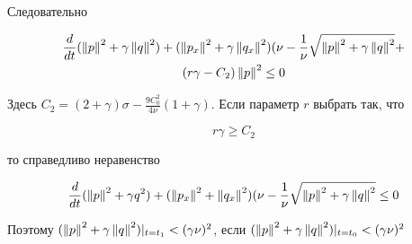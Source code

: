 Следовательно

\begin{gather*}
    \frac{d}{dt}(\left\lVert p\right\rVert^2 + \gamma \left\lVert q\right\rVert^2) + (\left\lVert p_x\right\rVert^2 + \gamma
    \left\lVert q_x\right\rVert^2)(\nu - \frac{1}{\nu}\sqrt{\left\lVert p\right\rVert^2 + \gamma \left\lVert q\right\rVert^2} + \\
    (r \gamma - C_2)\left\lVert p\right\rVert^2 \le 0
\end{gather*}

Здесь $C_2 = (2 + \gamma)\sigma - \frac{9C_0^2}{4\nu}(1 + \gamma)$. Если
параметр $r$ выбрать так, что 

\begin{equation}
    r\gamma \ge C_2
\end{equation}

то справедливо неравенство

\begin{equation}
    \frac{d}{dt}(\left\lVert p\right\rVert^2 + \gamma{q}^2) + (\left\lVert p_x\right\rVert^2 + \left\lVert q_x\right\rVert^2)(\nu -
    \frac{1}{\nu}\sqrt{\left\lVert p\right\rVert^2+ \gamma \left\lVert q\right\rVert^2} \le 0
\end{equation}

Поэтому $(\left\lVert p\right\rVert^2 + \gamma \left\lVert q\right\rVert^2)|_{t=t_1} < (\gamma \nu)^2$, если
$(\left\lVert p\right\rVert^2 + \gamma \left\lVert q\right\rVert^2)|_{t=t_0} < (\gamma \nu)^2$
